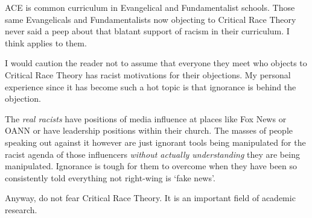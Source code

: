 ACE is common curriculum in Evangelical and Fundamentalist schools. Those same Evangelicals and Fundamentalists now objecting to Critical Race Theory never said a peep about that blatant support of racism in their curriculum. I think  applies to them.

\bigskip

I would caution the reader not to assume that everyone they meet who objects to Critical Race Theory has racist motivations for their objections. My personal experience since it has become such a hot topic is that ignorance is behind the objection.

The \emph{real racists} have positions of media influence at places like Fox News or OANN or have leadership positions within their church. The masses of people speaking out against it however are just ignorant tools being manipulated for the racist agenda of those influencers \emph{without actually understanding} they are being manipulated. Ignorance is tough for them to overcome when they have been so consistently told everything not right-wing is `fake news'.

Anyway, do not fear Critical Race Theory. It is an important field of academic research.

